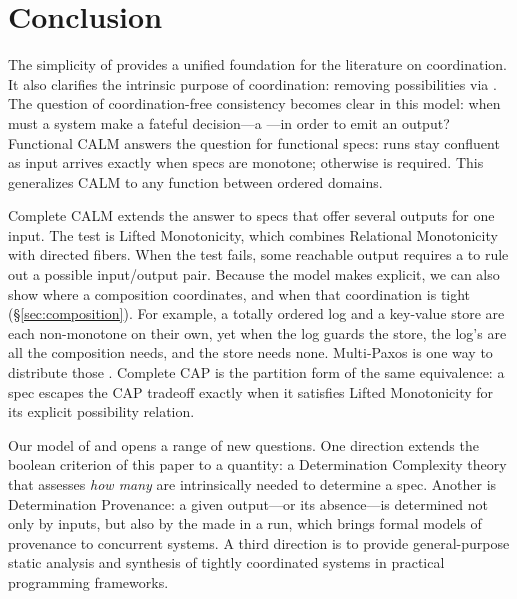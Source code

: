 \section{Conclusion}
\label{sec:conclusion}

The simplicity of \spectype[s] provides a unified foundation for the
literature on coordination. It also clarifies the intrinsic purpose of
coordination: removing possibilities via \commitments. The question of
coordination-free consistency becomes clear in this model: when must a system
make a fateful decision---a \commitment---in order to emit an output? Functional CALM answers
the question for functional specs:  runs stay confluent as input arrives exactly
when specs are monotone; otherwise \commitment is required.  This generalizes CALM to any function between ordered domains.

Complete CALM extends the answer to specs that offer several outputs
for one input.  The test is Lifted Monotonicity, which combines Relational
Monotonicity with directed fibers.  When the test fails, some reachable output
requires a \commitment to rule out a possible input/output pair.
Because the model makes \commitments explicit, we can also show where a
composition coordinates, and when that coordination is tight (\S\ref{sec:composition}).  For example, a totally ordered log
and a key-value store are each non-monotone on their own, yet when the log
guards the store, the log's \commitments are all the composition needs, and
the store needs none.  Multi-Paxos is one way to distribute those
\commitments.
Complete CAP is the partition form of the same equivalence: a spec escapes
the CAP tradeoff exactly when it satisfies Lifted Monotonicity for its explicit possibility relation.

Our model of \spectype[s] and \commitments opens a range of new questions.
One direction
extends the boolean criterion of this paper to a quantity: a Determination
Complexity theory that assesses \emph{how many} \commitments are intrinsically
needed to determine a spec. Another is Determination Provenance: a
given output---or its absence---is determined not only by inputs, but also by
the \commitments made in a run, which brings formal models of provenance to
concurrent systems. A third direction is to provide general-purpose static
analysis and synthesis of tightly coordinated systems in practical programming frameworks.
